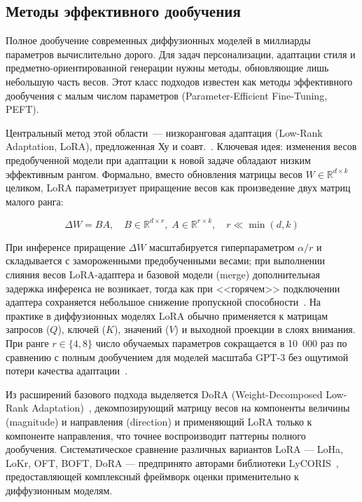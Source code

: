 \subsection{Методы эффективного дообучения}

Полное дообучение современных диффузионных моделей в миллиарды параметров вычислительно дорого. Для задач персонализации, адаптации стиля и предметно-ориентированной генерации нужны методы, обновляющие лишь небольшую часть весов. Этот класс подходов известен как методы эффективного дообучения с малым числом параметров (Parameter-Efficient Fine-Tuning, PEFT).

Центральный метод этой области~--- низкоранговая адаптация (Low-Rank Adaptation, LoRA), предложенная Ху и соавт.~\cite{hu2022lora}. Ключевая идея: изменения весов предобученной модели при адаптации к новой задаче обладают низким эффективным рангом. Формально, вместо обновления матрицы весов $W \in \mathbb{R}^{d \times k}$ целиком, LoRA параметризует приращение весов как произведение двух матриц малого ранга:

\begin{equation}
    \Delta W = B A, \quad B \in \mathbb{R}^{d \times r},\; A \in \mathbb{R}^{r \times k}, \quad r \ll \min(d, k)
    \label{eq:lora_lit}
\end{equation}

При инференсе приращение $\Delta W$ масштабируется гиперпараметром $\alpha / r$ и складывается с замороженными предобученными весами; при выполнении слияния весов LoRA-адаптера и базовой модели (merge) дополнительная задержка инференса не возникает, тогда как при <<горячем>> подключении адаптера сохраняется небольшое снижение пропускной способности~\cite{hu2022lora}. На практике в диффузионных моделях LoRA обычно применяется к матрицам запросов ($Q$), ключей ($K$), значений ($V$) и выходной проекции в слоях внимания. При ранге $r \in \{4, 8\}$ число обучаемых параметров сокращается в 10~000 раз по сравнению с полным дообучением для моделей масштаба GPT-3 без ощутимой потери качества адаптации~\cite{hu2022lora}.

Из расширений базового подхода выделяется DoRA (Weight-Decomposed Low-Rank Adaptation)~\cite{liu2024dora}, декомпозирующий матрицу весов на компоненты величины (magnitude) и направления (direction) и применяющий LoRA только к компоненте направления, что точнее воспроизводит паттерны полного дообучения. Систематическое сравнение различных вариантов LoRA --- LoHa, LoKr, OFT, BOFT, DoRA --- предпринято авторами библиотеки LyCORIS~\cite{yeh2024lycoris}, предоставляющей комплексный фреймворк оценки применительно к диффузионным моделям.


